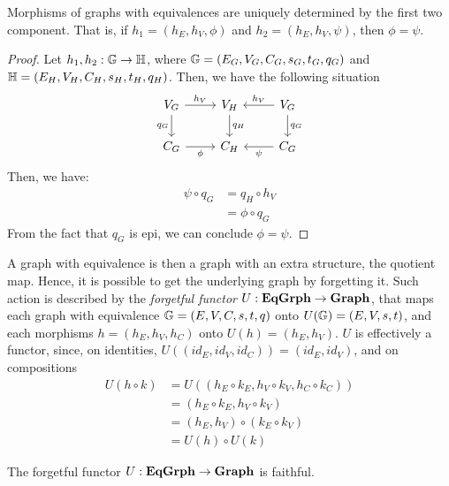 \begin{obs}\label{obs:eq_grph_morph_det_by_first_two_comp}
    Morphisms of graphs with equivalences are uniquely determined by the first two component. That is, if $h_1 = (h_E, h_V, \phi)$ and $h_2 = (h_E, h_V, \psi)$, then $\phi = \psi$.
\end{obs}

\begin{proof}
    Let $h_1, h_2 : \mathbb{G \to H}$, where $\mathbb{G} = (E_G, V_G, C_G, s_G, t_G, q_G)$ and $\mathbb{H} = (E_H, V_H, C_H, s_H, t_H, q_H)$. Then, we have the following situation
    \[
        \begin{tikzcd}
            V_G \arrow[r, "{h_V}"] \arrow[d, "{q_G}"swap] & V_H \arrow[d, "{q_H}"] & V_G \arrow[l, "{h_V}"swap] \arrow[d, "{q_G}"] \\
            C_G \arrow[r, "{\phi}"swap] & C_H & \arrow[l, "{\psi}"] C_G
        \end{tikzcd}
     \]
     Then, we have:
     \begin{align*}
         \psi \circ q_G &= q_H \circ h_V \\
                        &= \phi \circ q_G
     \end{align*}
     From the fact that $q_G$ is epi, we can conclude $\phi = \psi$.
\end{proof}

A graph with equivalence is then a graph with an extra structure, the quotient map. Hence, it is possible to get the underlying graph by forgetting it. Such action is described by the \emph{forgetful functor} $U : \mathbf{EqGrph} \to \mathbf{Graph}$, that maps each graph with equivalence $\mathbb{G} =  (E, V, C, s, t, q)$ onto $U(\mathbb{G}) = (E, V, s, t)$, and each morphisms $h = (h_E, h_V, h_C)$ onto $U(h) = (h_E, h_V)$. $U$ is effectively a functor, since, on identities, $U((id_E, id_V, id_C)) = (id_E, id_V)$, and on compositions 
\[\begin{split}
	U(h \circ k) &= U((h_E \circ k_E, h_V \circ k_V, h_C \circ k_C))\\ &= (h_E \circ k_E, h_V \circ k_V) \\&= (h_E, h_V) \circ (k_E \circ k_V) \\&= U(h) \circ U(k)
\end{split}\]

\begin{prop}\label{prop:U_is_faithf}
    The forgetful functor $U: \mathbf{EqGrph} \to \mathbf{Graph}$ is faithful.
\end{prop}

